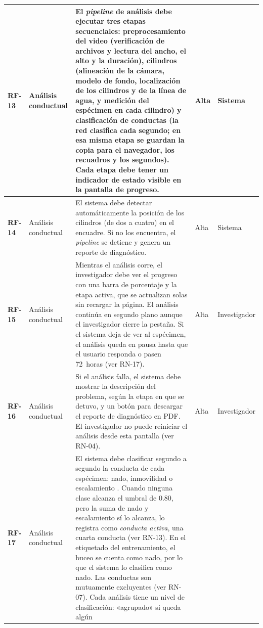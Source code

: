 \begin{longtable}{|>{\bfseries}p{1.1cm}|>{\raggedright}p{2.8cm}|>{\raggedright\arraybackslash}p{5.7cm}|p{1.3cm}|p{2.2cm}|}
RF-13 & Análisis conductual
      & El \textit{pipeline} de análisis debe ejecutar tres etapas secuenciales:
        preprocesamiento del video (verificación de archivos y lectura del ancho, el
        alto y la duración), cilindros (alineación de la cámara, modelo de fondo,
        localización de los cilindros y de la línea de agua, y medición del espécimen en
        cada cilindro) y clasificación de conductas (la red clasifica cada segundo; en esa
        misma etapa se guardan la copia para el navegador, los recuadros y los segundos).
        Cada etapa debe tener un indicador de estado visible en la pantalla de progreso.
      & Alta & Sistema \\
\hline
RF-14 & Análisis conductual
      & El sistema debe detectar automáticamente la posición de los cilindros (de dos
        a cuatro) en el encuadre. Si no los encuentra, el \textit{pipeline} se detiene y
        genera un reporte de diagnóstico.
      & Alta & Sistema \\
\hline
RF-15 & Análisis conductual
      & Mientras el análisis corre, el investigador debe ver el progreso con una
        barra de porcentaje y la etapa activa, que se actualizan solas sin recargar la página.
        El análisis continúa
        en segundo plano aunque el investigador cierre la pestaña. Si el sistema deja de
        ver al espécimen, el análisis queda en pausa hasta que el usuario responda
        o pasen 72~horas (ver RN-17).
      & Alta & Investigador \\
\hline
RF-16 & Análisis conductual
      & Si el análisis falla, el sistema debe mostrar la descripción del problema,
        según la etapa en que se detuvo, y un botón para descargar el reporte de
        diagnóstico en PDF. El investigador no puede reiniciar el análisis desde esta
        pantalla (ver RN-04).
      & Alta & Investigador \\
\hline
RF-17 & Análisis conductual
      & El sistema debe clasificar segundo a segundo la conducta de cada espécimen: nado,
        inmovilidad o escalamiento \cite{armario2021}. Cuando ninguna clase alcanza el umbral de 0.80, pero la suma de nado y escalamiento sí lo alcanza, lo registra como
        \textit{conducta activa}, una cuarta conducta (ver RN-13). En el etiquetado del entrenamiento, el buceo se
        cuenta como nado, por lo que el sistema lo clasifica como nado. Las conductas son mutuamente excluyentes (ver
        RN-07). Cada análisis tiene un nivel de clasificación: «agrupado» si queda algún

\end{longtable}
